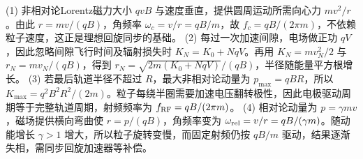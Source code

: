 (1) 非相对论Lorentz磁力大小 \(qvB\) 与速度垂直，提供圆周运动所需向心力 \(mv^2/r\)。由此 \(r=mv/(qB)\)，角频率 \(\omega_c=v/r=qB/m\)，故 \(f_c=qB/(2\pi m)\)，不依赖粒子速度，这正是理想回旋同步的基础。
(2) 每过一次加速间隙，电场做正功 \(qV\)，因此忽略间隙飞行时间及辐射损失时 \(K_N=K_0+NqV\)。再用 \(K_N=mv_N^2/2\) 与 \(r_N=mv_N/(qB)\)，得到 \(r_N=\sqrt{2m(K_0+NqV)}/(qB)\)，半径随能量平方根增长。
(3) 若最后轨道半径不超过 \(R\)，最大非相对论动量为 \(p_{\max}=qBR\)，所以 \(K_{\max}=q^2B^2R^2/(2m)\)。粒子每绕半圈需要加速电压翻转极性，因此电极驱动周期等于完整轨道周期，射频频率为 \(f_{\rm RF}=qB/(2\pi m)\)。
(4) 相对论动量为 \(p=\gamma mv\)，磁场提供横向弯曲使 \(r=p/(qB)\)，角频率变为 \(\omega_{\rm rel}=v/r=qB/(\gamma m)\)。随动能增长 \(\gamma>1\) 增大，所以粒子旋转变慢，而固定射频仍按 \(qB/m\) 驱动，结果逐渐失相，需同步回旋加速器等补偿。
